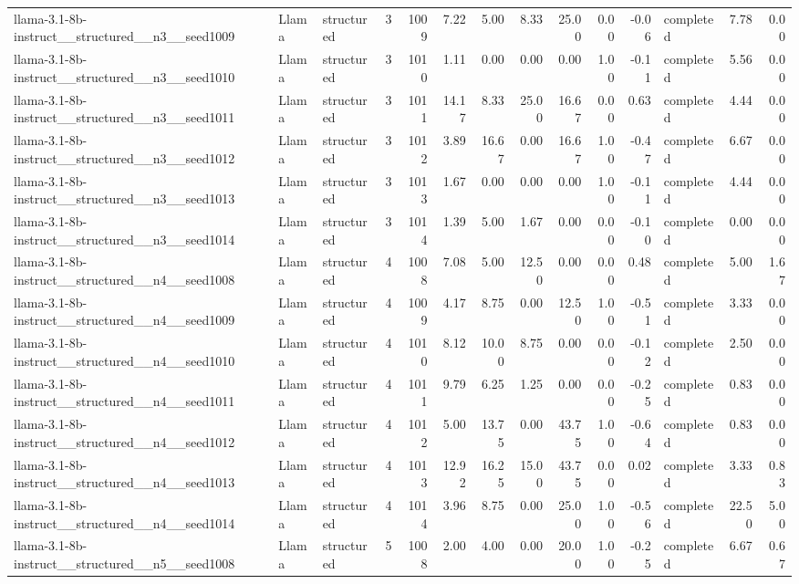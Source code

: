 \begin{longtable}{lllrrrrrrrrlrr}
llama-3.1-8b-instruct\_\_structured\_\_n3\_\_seed1009 & Llama & structured & 3 & 1009 & 7.22 & 5.00 & 8.33 & 25.00 & 0.00 & -0.06 & completed & 7.78 & 0.00 \\
llama-3.1-8b-instruct\_\_structured\_\_n3\_\_seed1010 & Llama & structured & 3 & 1010 & 1.11 & 0.00 & 0.00 & 0.00 & 1.00 & -0.11 & completed & 5.56 & 0.00 \\
llama-3.1-8b-instruct\_\_structured\_\_n3\_\_seed1011 & Llama & structured & 3 & 1011 & 14.17 & 8.33 & 25.00 & 16.67 & 0.00 & 0.63 & completed & 4.44 & 0.00 \\
llama-3.1-8b-instruct\_\_structured\_\_n3\_\_seed1012 & Llama & structured & 3 & 1012 & 3.89 & 16.67 & 0.00 & 16.67 & 1.00 & -0.47 & completed & 6.67 & 0.00 \\
llama-3.1-8b-instruct\_\_structured\_\_n3\_\_seed1013 & Llama & structured & 3 & 1013 & 1.67 & 0.00 & 0.00 & 0.00 & 1.00 & -0.11 & completed & 4.44 & 0.00 \\
llama-3.1-8b-instruct\_\_structured\_\_n3\_\_seed1014 & Llama & structured & 3 & 1014 & 1.39 & 5.00 & 1.67 & 0.00 & 0.00 & -0.10 & completed & 0.00 & 0.00 \\
llama-3.1-8b-instruct\_\_structured\_\_n4\_\_seed1008 & Llama & structured & 4 & 1008 & 7.08 & 5.00 & 12.50 & 0.00 & 0.00 & 0.48 & completed & 5.00 & 1.67 \\
llama-3.1-8b-instruct\_\_structured\_\_n4\_\_seed1009 & Llama & structured & 4 & 1009 & 4.17 & 8.75 & 0.00 & 12.50 & 1.00 & -0.51 & completed & 3.33 & 0.00 \\
llama-3.1-8b-instruct\_\_structured\_\_n4\_\_seed1010 & Llama & structured & 4 & 1010 & 8.12 & 10.00 & 8.75 & 0.00 & 0.00 & -0.12 & completed & 2.50 & 0.00 \\
llama-3.1-8b-instruct\_\_structured\_\_n4\_\_seed1011 & Llama & structured & 4 & 1011 & 9.79 & 6.25 & 1.25 & 0.00 & 0.00 & -0.25 & completed & 0.83 & 0.00 \\
llama-3.1-8b-instruct\_\_structured\_\_n4\_\_seed1012 & Llama & structured & 4 & 1012 & 5.00 & 13.75 & 0.00 & 43.75 & 1.00 & -0.64 & completed & 0.83 & 0.00 \\
llama-3.1-8b-instruct\_\_structured\_\_n4\_\_seed1013 & Llama & structured & 4 & 1013 & 12.92 & 16.25 & 15.00 & 43.75 & 0.00 & 0.02 & completed & 3.33 & 0.83 \\
llama-3.1-8b-instruct\_\_structured\_\_n4\_\_seed1014 & Llama & structured & 4 & 1014 & 3.96 & 8.75 & 0.00 & 25.00 & 1.00 & -0.56 & completed & 22.50 & 5.00 \\
llama-3.1-8b-instruct\_\_structured\_\_n5\_\_seed1008 & Llama & structured & 5 & 1008 & 2.00 & 4.00 & 0.00 & 20.00 & 1.00 & -0.25 & completed & 6.67 & 0.67 \\

\end{longtable}
